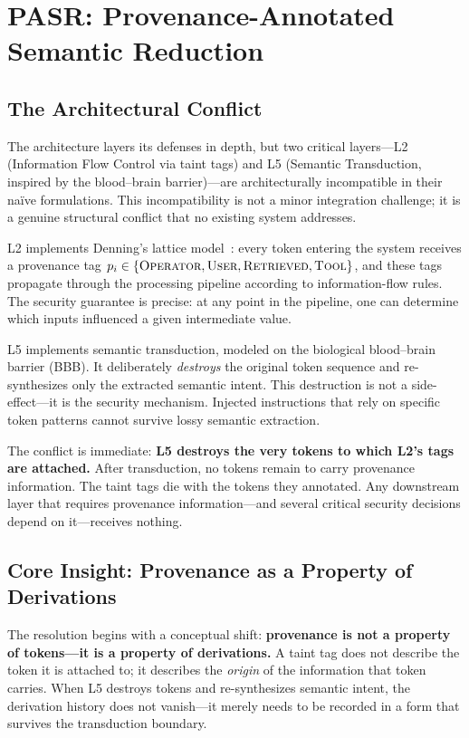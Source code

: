\section{PASR: Provenance-Annotated Semantic Reduction}
\label{sec:pasr}

\subsection{The Architectural Conflict}

The \sentinel architecture layers its defenses in depth, but two critical
layers---L2 (Information Flow Control via taint tags) and L5 (Semantic
Transduction, inspired by the blood--brain barrier)---are architecturally
incompatible in their na\"ive formulations. This incompatibility is not a
minor integration challenge; it is a genuine structural conflict that no
existing system addresses.

L2 implements Denning's lattice model~\cite{denning1976}: every token entering
the system receives a provenance tag $p_i \in \{\textsc{Operator},
\textsc{User}, \textsc{Retrieved}, \textsc{Tool}\}$, and these tags propagate
through the processing pipeline according to information-flow rules. The
security guarantee is precise: at any point in the pipeline, one can determine
which inputs influenced a given intermediate value.

L5 implements semantic transduction, modeled on the biological blood--brain
barrier (BBB). It deliberately \emph{destroys} the original token sequence and
re-synthesizes only the extracted semantic intent. This destruction is not a
side-effect---it is the security mechanism. Injected instructions that rely on
specific token patterns cannot survive lossy semantic extraction.

The conflict is immediate: \textbf{L5 destroys the very tokens to which L2's
tags are attached.} After transduction, no tokens remain to carry provenance
information. The taint tags die with the tokens they annotated. Any downstream
layer that requires provenance information---and several critical security
decisions depend on it---receives nothing.

\subsection{Core Insight: Provenance as a Property of Derivations}

The resolution begins with a conceptual shift: \textbf{provenance is not a
property of tokens---it is a property of derivations.} A taint tag does not
describe the token it is attached to; it describes the \emph{origin} of the
information that token carries. When L5 destroys tokens and re-synthesizes
semantic intent, the derivation history does not vanish---it merely needs to
be recorded in a form that survives the transduction boundary.

